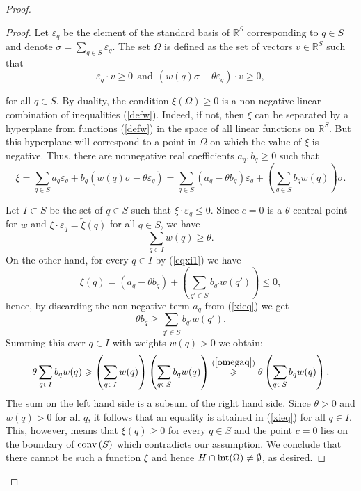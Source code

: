 \documentclass{daj}
\renewcommand{\le}{\leqslant}
\renewcommand{\ge}{\geqslant}
\newcommand{\R}{\mathbb R}
\newcommand{\conv}{{\rm conv}\,}
\theoremstyle{definition}
\theoremstyle{remark}
\theoremstyle{definition}
\theoremstyle{definition}
\begin{document}
\begin{proof}
\begin{proof}
Let $\varepsilon_q$ be the element of the standard basis of $\R^S$ corresponding to $q \in S$ and denote $\sigma = \sum_{q \in S}\varepsilon_q$. The set $\Omega$ is defined as the set of vectors $v \in \R^S$ such that
\begin{equation} \label{defw}
\varepsilon_q \cdot v \ge 0~~ \text{and} ~~(w(q)\sigma - \theta \varepsilon_q) \cdot v \ge 0,
\end{equation}

for all $q \in S$. By duality, the condition $\xi(\Omega) \ge 0$ is a non-negative linear combination of inequalities (\ref{defw}).
Indeed, if not, then $\xi$ can be separated by a hyperplane from functions (\ref{defw}) in the space of all linear functions on $\R^S$. But this hyperplane will correspond to a point in $\Omega$ on which the value of $\xi$ is negative.
Thus, there are nonnegative real coefficients $a_q, b_q \ge 0$ such that
\begin{equation}\label{eqxi1}
    \xi = \sum_{q \in S} a_q \varepsilon_q + b_q (w(q)\sigma - \theta \varepsilon_q) = \sum_{q \in S} (a_q - \theta b_q)\varepsilon_q + \left( \sum_{q \in S} b_q w(q) \right) \sigma.
\end{equation}

Let $I \subset S$ be the set of $q \in S$ such that $\xi \cdot \varepsilon_q \le 0$. Since $c= 0$ is a $\theta$-central point for $w$ and $\xi\cdot \varepsilon_q = \tilde \xi(q)$ for all $q \in S$, we have 
\begin{equation}\label{omegaq}
\sum_{q \in I} w(q) \ge \theta. 
\end{equation}
On the other hand, for every $q \in I$ by (\ref{eqxi1}) we have
\begin{equation}\label{xieq}
\xi(q) = (a_q - \theta b_q) + \left(\sum_{q' \in S} b_{q'} w(q') \right) \le 0,
\end{equation}
hence, by discarding the non-negative term $a_q$ from (\ref{xieq}) we get
$$
\theta b_q \ge \sum_{q' \in S} b_{q'} w(q').
$$
Summing this over $q \in I$ with weights $w(q)>0$ we obtain:
$$
\theta \sum_{q \in I} b_q w(q) \ge \left( \sum_{q \in I} w(q) \right) \left( \sum_{q \in S} b_{q} w(q)  \right) \stackrel{(\ref{omegaq})}{\ge} \theta \left( \sum_{q \in S} b_{q} w(q)  \right).
$$
The sum on the left hand side is a subsum of the right hand side. Since $\theta > 0$ and $w(q) > 0$ for all $q$, it follows that an equality is attained in (\ref{xieq}) for all $q \in I$. This, however, means that $\xi(q) \ge 0$ for every $q\in S$ and the point $c = 0$ lies on the boundary of $\conv(S)$ which contradicts our assumption.
We conclude that there cannot be such a function $\xi$ and hence $H \cap {\rm int}(\Omega) \neq \emptyset$, as desired.
\end{proof}


\end{proof}
\end{document}
